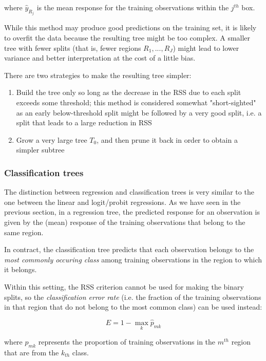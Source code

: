 where $\hat{y}_{R_j}$ is the mean response for the training observations within the $j^{th}$ box.

While this method may produce good predictions on the training set, it is likely to overfit the data because the resulting tree might be too complex. A
smaller tree with fewer splits (that is, fewer regions $R_1, ..., R_J$) might lead to lower variance and better interpretation at the cost of a little bias.

There are two strategies to make the resulting tree simpler:

\begin{enumerate}
    \item Build the tree only so long as the decrease in the RSS due to each split exceeds some threshold; this method is considered somewhat "short-sighted" as an early below-threshold split might be followed by a very good split, i.e. a split that leads to a large reduction in RSS
    \item Grow a very large tree $T_0$, and then prune it back in order to obtain a simpler subtree
\end{enumerate}

\subsubsection{Classification trees}
The distinction between regression and classification trees is very similar to the one between the linear and logit/probit regressions. As we have seen in the previous section, in a regression tree, the predicted response for an observation is given by the (mean) response of the training observations that belong to the same region.

In contract, the classification tree predicts that each observation belongs to the \textit{most commonly occuring class} among training observations in the region to which it belongs.

Within this setting, the RSS criterion cannot be used for making the binary splits, so the \textit{classification error rate} (i.e. the fraction of the training observations in that region that do not belong to the most common class) can be used instead:

\begin{equation}
    E = 1 - \max_k{\hat{p}_{mk}}
\end{equation}

where $\hat{p}_{mk}$ represents the proportion of training observations in the $m^{th}$ region that are from the $k_{th}$ class.

